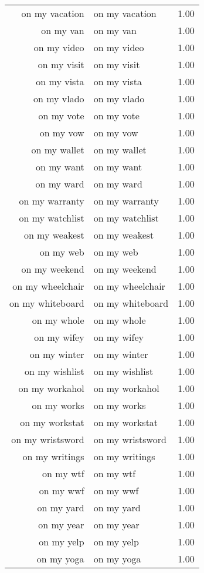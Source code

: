 \begin{table}[ht]
\begin{tabular}{rlr}
  on my vacation & on my vacation & 1.00 \\ 
  on my van & on my van & 1.00 \\ 
  on my video & on my video & 1.00 \\ 
  on my visit & on my visit & 1.00 \\ 
  on my vista & on my vista & 1.00 \\ 
  on my vlado & on my vlado & 1.00 \\ 
  on my vote & on my vote & 1.00 \\ 
  on my vow & on my vow & 1.00 \\ 
  on my wallet & on my wallet & 1.00 \\ 
  on my want & on my want & 1.00 \\ 
  on my ward & on my ward & 1.00 \\ 
  on my warranty & on my warranty & 1.00 \\ 
  on my watchlist & on my watchlist & 1.00 \\ 
  on my weakest & on my weakest & 1.00 \\ 
  on my web & on my web & 1.00 \\ 
  on my weekend & on my weekend & 1.00 \\ 
  on my wheelchair & on my wheelchair & 1.00 \\ 
  on my whiteboard & on my whiteboard & 1.00 \\ 
  on my whole & on my whole & 1.00 \\ 
  on my wifey & on my wifey & 1.00 \\ 
  on my winter & on my winter & 1.00 \\ 
  on my wishlist & on my wishlist & 1.00 \\ 
  on my workahol & on my workahol & 1.00 \\ 
  on my works & on my works & 1.00 \\ 
  on my workstat & on my workstat & 1.00 \\ 
  on my wristsword & on my wristsword & 1.00 \\ 
  on my writings & on my writings & 1.00 \\ 
  on my wtf & on my wtf & 1.00 \\ 
  on my wwf & on my wwf & 1.00 \\ 
  on my yard & on my yard & 1.00 \\ 
  on my year & on my year & 1.00 \\ 
  on my yelp & on my yelp & 1.00 \\ 
  on my yoga & on my yoga & 1.00 \\ 

\end{tabular}
\end{table}
